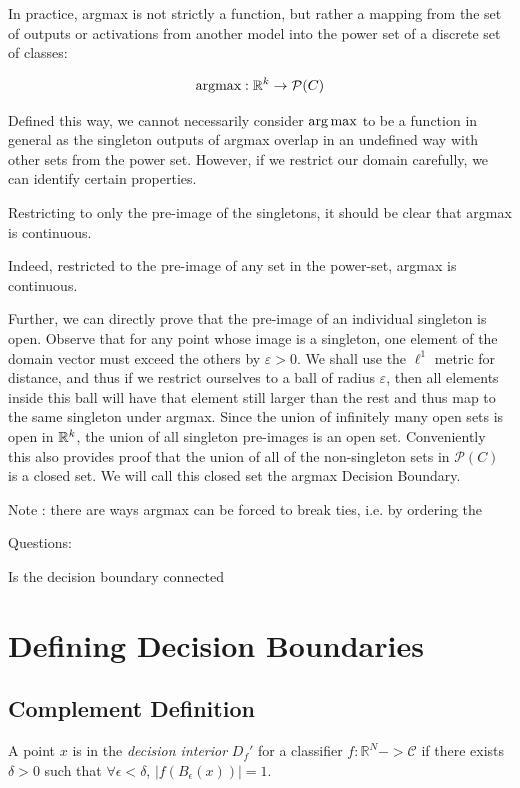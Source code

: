 In practice, argmax is not strictly a function, but rather a mapping from the set of outputs or activations from another model into the power set of a discrete set of classes:

\begin{equation}
    \text{argmax} : \mathbb{R}^k \to \mathcal{P}(C)
\end{equation}

Defined this way, we cannot necessarily consider $\operatorname*{arg\,max}$ to be a function in general as the singleton outputs of argmax overlap in an undefined way with other sets from the power set. However, if we restrict our domain carefully, we can identify certain properties. 

Restricting to only the pre-image of the singletons, it should be clear that argmax is continuous. 

Indeed, restricted to the pre-image of any set in the power-set, argmax is continuous. 

Further, we can directly prove that the pre-image of an individual singleton is open. Observe that for any point whose image is a singleton, one element of the domain vector must exceed the others by $\varepsilon > 0$. We shall use the $\ell^1$ metric for distance, and thus if we restrict ourselves to a ball of radius $\varepsilon$, then all elements inside this ball will have that element still larger than the rest and thus map to the same singleton under argmax. Since the union of infinitely many open sets is open in $\mathbb{R}^k$, the union of all singleton pre-images is an open set. Conveniently this also provides proof that the union of all of the non-singleton sets in $\mathcal{P}(C)$ is a closed set. We will call this closed set the argmax Decision Boundary. 

Note : there are ways argmax can be forced to break ties, i.e. by ordering the 

Questions:

Is the decision boundary connected


\section{Defining Decision Boundaries}

\subsection{Complement Definition}

A point $x$ is in the \emph{decision interior} $D_f'$ for a classifier $f: \mathbb{R}^N -> \mathcal{C}$ if there exists $\delta > 0$ such that $\forall \epsilon < \delta$, $|f(B_\epsilon(x))| = 1$. 

